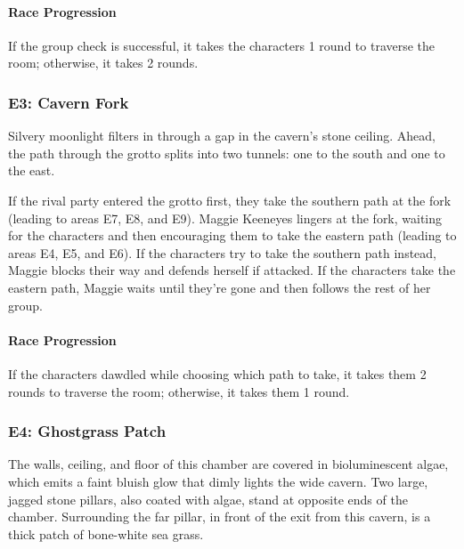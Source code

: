 \documentclass[a4paper, 11pt, bg=full, twocolumn, nooutline]{dndbook}
\begin{document}
\paragraph{Race Progression}

If the group check is successful, it takes the characters 1 round to traverse the room; otherwise, it takes 2 rounds.

\subsubsection{E3: Cavern Fork}

\begin{DndReadAloud}
Silvery moonlight filters in through a gap in the cavern's stone ceiling. Ahead, the path through the grotto splits into two tunnels: one to the south and one to the east.
\end{DndReadAloud}

If the rival party entered the grotto first, they take the southern path at the fork (leading to areas E7, E8, and E9). Maggie Keeneyes lingers at the fork, waiting for the characters and then encouraging them to take the eastern path (leading to areas E4, E5, and E6). If the characters try to take the southern path instead, Maggie blocks their way and defends herself if attacked. If the characters take the eastern path, Maggie waits until they're gone and then follows the rest of her group.

\paragraph{Race Progression}

If the characters dawdled while choosing which path to take, it takes them 2 rounds to traverse the room; otherwise, it takes them 1 round.

\subsubsection{E4: Ghostgrass Patch}

\begin{DndReadAloud}
The walls, ceiling, and floor of this chamber are covered in bioluminescent algae, which emits a faint bluish glow that dimly lights the wide cavern. Two large, jagged stone pillars, also coated with algae, stand at opposite ends of the chamber. Surrounding the far pillar, in front of the exit from this cavern, is a thick patch of bone-white sea grass.
\end{DndReadAloud}
\end{document}

